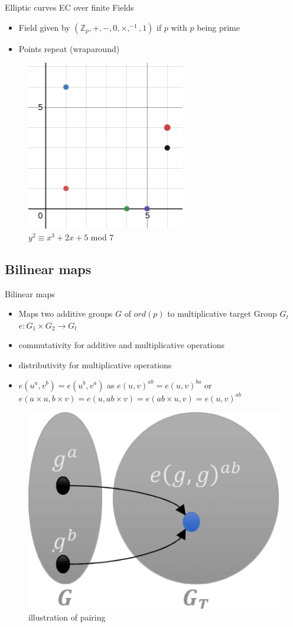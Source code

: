 \documentclass{beamer}
\begin{document}
\begin{frame}{Elliptic curves}
	EC over finite Fields
	\begin{itemize}
		\item Field given by $(\mathbb{Z}_p,+,-,0,\times,^{-1},1)$ if $p$ with $p$ being prime
		\item Points repeat (wraparound)
	\end{itemize}
	\begin{figure}[hbt!]
		\centering
		\includegraphics[width=0.4\linewidth]{ec3}
		\caption{$y^2 \equiv x^3 + 2x + 5$ mod $7$}
	\end{figure}
\end{frame}
\subsection{Bilinear maps}
\begin{frame}{Bilinear maps}
	\begin{itemize}
		\item Maps two additive groups $G$ of $ord(p)$ to multiplicative target Group $G_t$ $e: G_1 \times G_2 \rightarrow G_t$
		\item commutativity for additive and multiplicative operations
		\item distributivity for multiplicative operations
		\item $e(u^a,v^b) = e(u^b,v^a)$ as $e(u,v)^{ab} = e(u,v)^{ba}$ or $e(a\times{u},b\times{v}) = e(u,ab\times{v}) = e(ab\times{u},v) = e(u,v)^{ab}$
	\end{itemize}
	\begin{figure}[hbt!]
		\centering
		\includegraphics[width=0.25\linewidth]{pairing1}
		\caption{illustration of pairing}
	\end{figure}
\end{frame}
\end{document}
